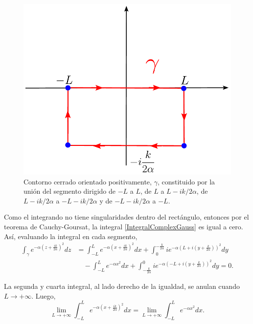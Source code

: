 \begin{ejemplo}
\begin{figure}[H]
    \centering
    \includegraphics[scale = 0.53]{Figuras/ContornoFourierGauss.pdf}
    \caption{Contorno cerrado orientado positivamente, $\gamma$, constituido por la unión del segmento dirigido de $-L$ a $L$, de $L$ a $L - ik/2\alpha$, de $L - ik/2\alpha$ a $-L - ik/2\alpha$ y de $-L - ik/2\alpha$ a $-L$.}
    \label{fig:ContornoGauss}
\end{figure}

Como el integrando no tiene singularidades dentro del rectángulo, entonces por el teorema de Cauchy-Goursat, la integral \eqref{IntegralComplexGauss} es igual a cero. Así, evaluando la integral en cada segmento,
\begin{align*}
 \int_{\gamma} e^{-\alpha \left( z + \frac{ik}{2\alpha} \right)^2} dz &= \int_{-L}^L e^{-\alpha \left( x + \frac{ik}{2\alpha} \right)^2} dx + \int_0^{- \frac{k}{2\alpha}} i e^{-\alpha \left( L + i \left( y + \frac{k}{2\alpha} \right) \right)^2} dy   \\
 & \quad - \int_{-L}^L e^{-\alpha x^2} dx + \int_{- \frac{k}{2\alpha}}^0 i e^{-\alpha \left(- L + i \left( y + \frac{k}{2\alpha} \right) \right)^2} dy = 0.
\end{align*}

La segunda y cuarta integral, al lado derecho de la igualdad, se anulan cuando $L \to + \infty$. Luego,
$$\lim_{L \to + \infty} \int_{-L}^L e^{-\alpha \left( x + \frac{ik}{2\alpha} \right)^2} dx = \lim_{L \to + \infty} \int_{-L}^L e^{-\alpha x^2} dx.$$


\end{ejemplo}
